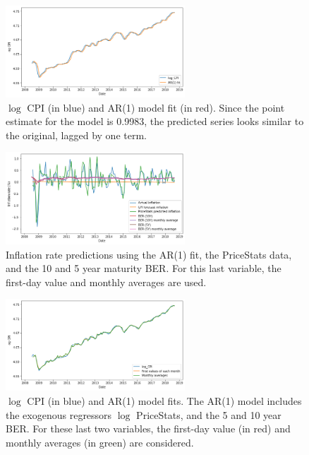 \documentclass[11pt, english]{article}
\begin{document}
\begin{multicols}{2}
\begin{figure}[b]
	\centering
	\caption{$\log$ CPI (in blue) and AR(1) model fit (in red). Since the point estimate for the model is 0.9983, the predicted series looks similar to the original, lagged by one term.}
	\label{fig:cpi-ar-fit}
	\includegraphics[width=0.6\textwidth]{cpi-ar-fit}
\end{figure}

\begin{figure}[b]
	\centering
	\caption{Inflation rate predictions using the AR(1) fit, the PriceStats data, and the 10 and 5 year maturity BER. For this last variable, the first-day value and monthly averages are used.}
	\label{fig:inflation-estimates}
	\includegraphics[width=0.6\textwidth]{inflation-estimates}
\end{figure}

\begin{figure}[b]
	\centering
	\caption{$\log$ CPI (in blue) and AR(1) model fits. The AR(1) model includes the exogenous regressors $\log$ PriceStats, and the 5 and 10 year BER. For these last two variables, the first-day value (in red) and monthly averages (in green) are considered.}
	\label{fig:cpi-part-d-fit}
	\includegraphics[width=0.6\textwidth]{cpi-part-d-fit}
\end{figure}



\end{multicols}
\end{document}

